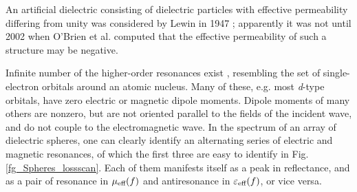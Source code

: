 An artificial dielectric consisting of dielectric particles with effective permeability differing from unity was considered by Lewin in 1947 \cite{lewin1947electrical}; apparently it was not until 2002 when O'Brien et al. computed \cite{obrien2002photonic} that the effective permeability of such a structure may be negative.
\label{negn_diel}


Infinite number of the higher-order resonances exist \cite[pp. 407-408]{mie1908beitrage}, resembling the set of single-electron orbitals around an atomic nucleus. Many of these, e.g. most \textit{d}-type orbitals, have zero electric or magnetic dipole moments. Dipole moments of many others are nonzero, but are not oriented parallel to the fields of the incident wave, and do not couple to the electromagnetic wave. In the spectrum of an array of dielectric spheres, one can clearly identify an alternating series of electric and magnetic resonances, of which the first three are easy to identify in Fig. \ref{fg_Spheres_lossscan}. Each of them manifests itself as a peak in reflectance, and as a pair of resonance in $\mu_{\text{eff} }(f)$ and antiresonance   in $\varepsilon_{\text{eff} }(f)$, or vice versa.

